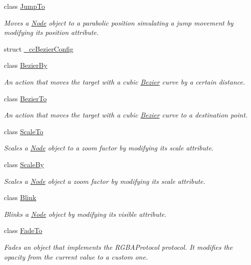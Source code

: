 \begin{DoxyCompactItemize}
class \hyperlink{classJumpTo}{Jump\+To}
\begin{DoxyCompactList}\small\item\em Moves a \hyperlink{classNode}{Node} object to a parabolic position simulating a jump movement by modifying it\textquotesingle{}s position attribute. \end{DoxyCompactList}\item 
struct \hyperlink{struct__ccBezierConfig}{\+\_\+cc\+Bezier\+Config}
\item 
class \hyperlink{classBezierBy}{Bezier\+By}
\begin{DoxyCompactList}\small\item\em An action that moves the target with a cubic \hyperlink{structBezier}{Bezier} curve by a certain distance. \end{DoxyCompactList}\item 
class \hyperlink{classBezierTo}{Bezier\+To}
\begin{DoxyCompactList}\small\item\em An action that moves the target with a cubic \hyperlink{structBezier}{Bezier} curve to a destination point. \end{DoxyCompactList}\item 
class \hyperlink{classScaleTo}{Scale\+To}
\begin{DoxyCompactList}\small\item\em Scales a \hyperlink{classNode}{Node} object to a zoom factor by modifying it\textquotesingle{}s scale attribute. \end{DoxyCompactList}\item 
class \hyperlink{classScaleBy}{Scale\+By}
\begin{DoxyCompactList}\small\item\em Scales a \hyperlink{classNode}{Node} object a zoom factor by modifying it\textquotesingle{}s scale attribute. \end{DoxyCompactList}\item 
class \hyperlink{classBlink}{Blink}
\begin{DoxyCompactList}\small\item\em Blinks a \hyperlink{classNode}{Node} object by modifying it\textquotesingle{}s visible attribute. \end{DoxyCompactList}\item 
class \hyperlink{classFadeTo}{Fade\+To}
\begin{DoxyCompactList}\small\item\em Fades an object that implements the R\+G\+B\+A\+Protocol protocol. It modifies the opacity from the current value to a custom one. \end{DoxyCompactList}\item 

\end{DoxyCompactItemize}
